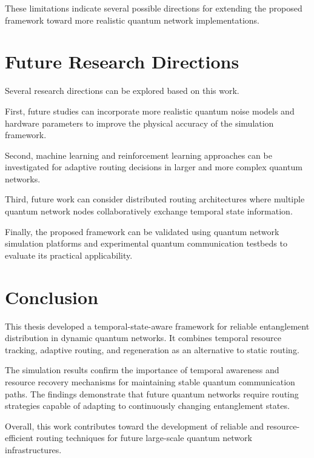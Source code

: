 These limitations indicate several possible directions for extending the
proposed framework toward more realistic quantum network implementations.


\section{Future Research Directions}

Several research directions can be explored based on this work.

First, future studies can incorporate more realistic quantum noise models and
hardware parameters to improve the physical accuracy of the simulation
framework.

Second, machine learning and reinforcement learning approaches can be
investigated for adaptive routing decisions in larger and more complex
quantum networks.

Third, future work can consider distributed routing architectures where
multiple quantum network nodes collaboratively exchange temporal state
information.

Finally, the proposed framework can be validated using quantum network
simulation platforms and experimental quantum communication testbeds to
evaluate its practical applicability.


\section{Conclusion}

This thesis developed a temporal-state-aware framework for reliable
entanglement distribution in dynamic quantum networks. It combines temporal
resource tracking, adaptive routing, and regeneration as an alternative to
static routing.

The simulation results confirm the importance of temporal awareness and
resource recovery mechanisms for maintaining stable quantum communication
paths. The findings demonstrate that future quantum networks require routing
strategies capable of adapting to continuously changing entanglement states.

Overall, this work contributes toward the development of reliable and
resource-efficient routing techniques for future large-scale quantum
network infrastructures.